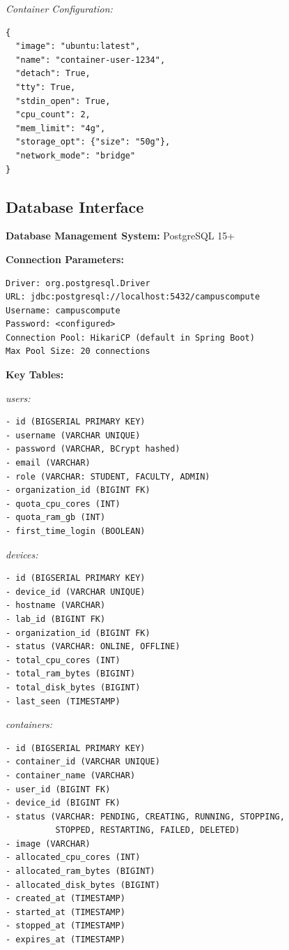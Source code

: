 \documentclass[12pt,a4paper]{article}
\begin{document}
\textit{Container Configuration:}
\begin{verbatim}
{
  "image": "ubuntu:latest",
  "name": "container-user-1234",
  "detach": True,
  "tty": True,
  "stdin_open": True,
  "cpu_count": 2,
  "mem_limit": "4g",
  "storage_opt": {"size": "50g"},
  "network_mode": "bridge"
}
\end{verbatim}

\subsection{Database Interface}

\textbf{Database Management System:} PostgreSQL 15+

\textbf{Connection Parameters:}
\begin{verbatim}
Driver: org.postgresql.Driver
URL: jdbc:postgresql://localhost:5432/campuscompute
Username: campuscompute
Password: <configured>
Connection Pool: HikariCP (default in Spring Boot)
Max Pool Size: 20 connections
\end{verbatim}

\textbf{Key Tables:}

\textit{users:}
\begin{verbatim}
- id (BIGSERIAL PRIMARY KEY)
- username (VARCHAR UNIQUE)
- password (VARCHAR, BCrypt hashed)
- email (VARCHAR)
- role (VARCHAR: STUDENT, FACULTY, ADMIN)
- organization_id (BIGINT FK)
- quota_cpu_cores (INT)
- quota_ram_gb (INT)
- first_time_login (BOOLEAN)
\end{verbatim}

\textit{devices:}
\begin{verbatim}
- id (BIGSERIAL PRIMARY KEY)
- device_id (VARCHAR UNIQUE)
- hostname (VARCHAR)
- lab_id (BIGINT FK)
- organization_id (BIGINT FK)
- status (VARCHAR: ONLINE, OFFLINE)
- total_cpu_cores (INT)
- total_ram_bytes (BIGINT)
- total_disk_bytes (BIGINT)
- last_seen (TIMESTAMP)
\end{verbatim}

\textit{containers:}
\begin{verbatim}
- id (BIGSERIAL PRIMARY KEY)
- container_id (VARCHAR UNIQUE)
- container_name (VARCHAR)
- user_id (BIGINT FK)
- device_id (BIGINT FK)
- status (VARCHAR: PENDING, CREATING, RUNNING, STOPPING, 
          STOPPED, RESTARTING, FAILED, DELETED)
- image (VARCHAR)
- allocated_cpu_cores (INT)
- allocated_ram_bytes (BIGINT)
- allocated_disk_bytes (BIGINT)
- created_at (TIMESTAMP)
- started_at (TIMESTAMP)
- stopped_at (TIMESTAMP)
- expires_at (TIMESTAMP)
\end{verbatim}
\end{document}
